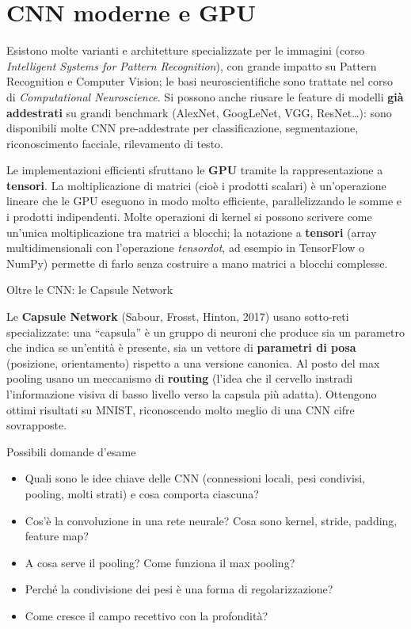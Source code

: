 \section{CNN moderne e GPU}\label{cnn-moderne-e-gpu}

Esistono molte varianti e architetture specializzate per le immagini
(corso \emph{Intelligent Systems for Pattern Recognition}), con grande
impatto su Pattern Recognition e Computer Vision; le basi
neuroscientifiche sono trattate nel corso di \emph{Computational
Neuroscience}. Si possono anche riusare le feature di modelli
\textbf{già addestrati} su grandi benchmark (AlexNet, GoogLeNet, VGG,
ResNet\ldots): sono disponibili molte CNN pre-addestrate per
classificazione, segmentazione, riconoscimento facciale, rilevamento di
testo.

Le implementazioni efficienti sfruttano le \textbf{GPU} tramite la
rappresentazione a \textbf{tensori}. La moltiplicazione di matrici (cioè
i prodotti scalari) è un'operazione lineare che le GPU eseguono in modo
molto efficiente, parallelizzando le somme e i prodotti indipendenti.
Molte operazioni di kernel si possono scrivere come un'unica
moltiplicazione tra matrici a blocchi; la notazione a \textbf{tensori}
(array multidimensionali con l'operazione \emph{tensordot}, ad esempio
in TensorFlow o NumPy) permette di farlo senza costruire a mano matrici
a blocchi complesse.

\begin{boxnote}{Oltre le CNN: le Capsule Network}

Le \textbf{Capsule Network} (Sabour, Frosst, Hinton, 2017) usano
sotto-reti specializzate: una ``capsula'' è un gruppo di neuroni che
produce sia un parametro che indica se un'entità è presente, sia un
vettore di \textbf{parametri di posa} (posizione, orientamento) rispetto
a una versione canonica. Al posto del max pooling usano un meccanismo di
\textbf{routing} (l'idea che il cervello instradi l'informazione visiva
di basso livello verso la capsula più adatta). Ottengono ottimi
risultati su MNIST, riconoscendo molto meglio di una CNN cifre
sovrapposte.

\end{boxnote}

\begin{boxquestion}{Possibili domande d'esame}

\begin{itemize}
\tightlist
\item
  Quali sono le idee chiave delle CNN (connessioni locali, pesi
  condivisi, pooling, molti strati) e cosa comporta ciascuna?
\item
  Cos'è la convoluzione in una rete neurale? Cosa sono kernel, stride,
  padding, feature map?
\item
  A cosa serve il pooling? Come funziona il max pooling?
\item
  Perché la condivisione dei pesi è una forma di regolarizzazione?
\item
  Come cresce il campo recettivo con la profondità?
\end{itemize}

\end{boxquestion}
